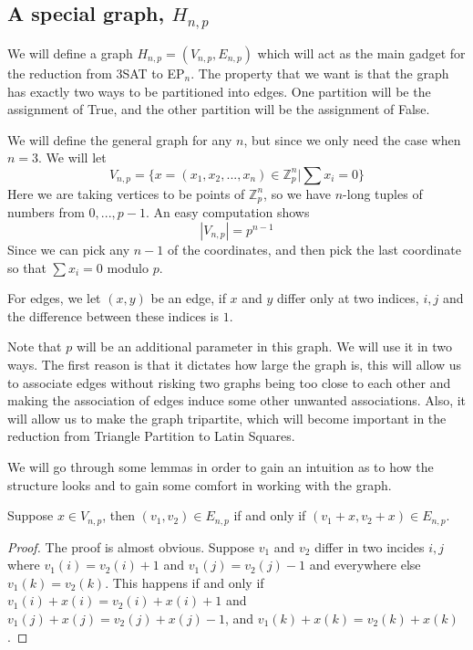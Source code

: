 \documentclass[runningheads,a4paper]{llncs}
\begin{document}
\subsection{A special graph, $H_{n,p}$}

We will define a graph $H_{n,p} = (V_{n,p}, E_{n,p})$ which will act as the main gadget for the reduction from 3SAT to EP$_{n}$. The property that we want is that the graph has exactly two ways to be partitioned into edges. One partition will be the assignment of True, and the other partition will be the assignment of False. 

We will define the general graph for any $n$, but since we only need the case when $n=3$. We will let 
\[ V_{n,p} = \{ x = (x_1, x_2, ..., x_n) \in \mathbb{Z}_p^n | \sum x_i = 0 \} \]
Here we are taking vertices to be points of $\mathbb{Z}_p^n$, so we have $n$-long tuples of numbers from $0, ..., p-1$. An easy computation shows
\[ |V_{n,p}| = p^{n-1} \]
Since we can pick any $n-1$ of the coordinates, and then pick the last coordinate so that $\sum x_i = 0$ modulo $p$.

For edges, we let $(x,y)$ be an edge, if $x$ and $y$ differ only at two indices, $i,j$ and the difference between these indices is $1$. 

Note that $p$ will be an additional parameter in this graph. We will use it in two ways. The first reason is that it dictates how large the graph is, this will allow us to associate edges without risking two graphs being too close to each other and making the association of edges induce some other unwanted associations. Also, it will allow us to make the graph tripartite, which will become important in the reduction from Triangle Partition to Latin Squares.

We will go through some lemmas in order to gain an intuition as to how the structure looks and to gain some comfort in working with the graph. 

\begin{lemma}
\label{lem:translation}
Suppose $x \in V_{n,p}$, then $(v_1, v_2) \in E_{n,p}$ if and only if $(v_1+x, v_2+x) \in E_{n,p}$.
\end{lemma}

\begin{proof}
The proof is almost obvious. Suppose $v_1$ and $v_2$ differ in two incides $i,j$ where $v_1(i) = v_2(i) + 1$ and $v_1(j) = v_2(j) - 1$ and everywhere else $v_1(k) = v_2(k)$. This happens if and only if $v_1(i) + x(i) = v_2(i) + x(i) + 1$ and $v_1(j) + x(j) = v_2(j) + x(j) - 1$, and $v_1(k) + x(k) = v_2(k) + x(k)$. 
\end{proof}
\end{document}
